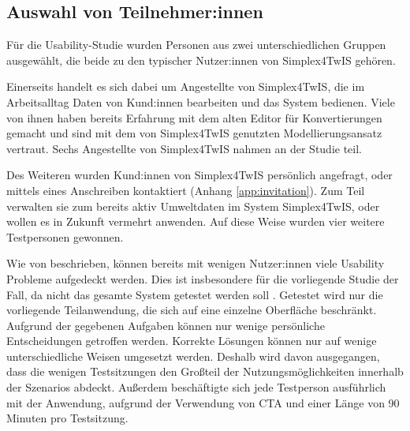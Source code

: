 \subsection{Auswahl von Teilnehmer:innen}

Für die Usability-Studie wurden Personen aus zwei unterschiedlichen Gruppen ausgewählt, die beide zu den typischer Nutzer:innen von Simplex4TwIS gehören.

Einerseits handelt es sich dabei um Angestellte von Simplex4TwIS, die im Arbeitsalltag Daten von Kund:innen bearbeiten und das System bedienen. Viele von ihnen haben bereits Erfahrung mit dem alten Editor für Konvertierungen gemacht und sind mit dem von Simplex4TwIS genutzten Modellierungsansatz vertraut. Sechs Angestellte von Simplex4TwIS nahmen an der Studie teil.

Des Weiteren wurden Kund:innen von Simplex4TwIS persönlich angefragt, oder mittels eines Anschreiben kontaktiert (Anhang \ref{app:invitation}). Zum Teil verwalten sie zum bereits aktiv Umweltdaten im System Simplex4TwIS, oder wollen es in Zukunft vermehrt anwenden. Auf diese Weise wurden vier weitere Testpersonen gewonnen.

Wie von \textcite{nielsenWhyYou2000} beschrieben, können bereits mit wenigen Nutzer:innen viele Usability Probleme aufgedeckt werden. Dies ist insbesondere für die vorliegende Studie der Fall, da nicht das gesamte System getestet werden soll \parencite[Vgl. \ref{sec:formative-summative}]{spoolTestingWeb2001}. Getestet wird nur die vorliegende Teilanwendung, die sich auf eine einzelne Oberfläche beschränkt. Aufgrund der gegebenen Aufgaben können nur wenige persönliche Entscheidungen getroffen werden. Korrekte Lösungen können nur auf wenige unterschiedliche Weisen umgesetzt werden. Deshalb wird davon ausgegangen, dass die wenigen Testsitzungen den Großteil der Nutzungsmöglichkeiten innerhalb der Szenarios abdeckt. Außerdem beschäftigte sich jede Testperson ausführlich mit der Anwendung, aufgrund der Verwendung von \ac{CTA} und einer Länge von 90 Minuten pro Testsitzung.
